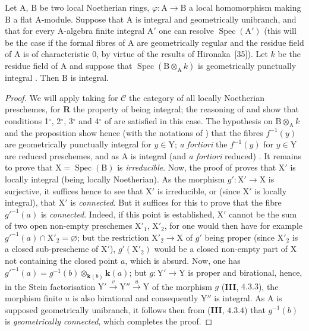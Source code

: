 \begin{corollary}[7.9.9]
\label{IV.7.9.9}
Let $\mathrm{A}$, $\mathrm{B}$ be two local Noetherian rings, $\varphi:\mathrm{A}\to\mathrm{B}$ a local homomorphism making $\mathrm{B}$ a flat $\mathrm{A}$-module. Suppose that $\mathrm{A}$ is integral and geometrically unibranch, and that for every $\mathrm{A}$-algebra finite integral $\mathrm{A}'$ one can resolve $\operatorname{Spec}(\mathrm{A}')$ (this will be the case if the formal fibres of $\mathrm{A}$ are geometrically regular and the residue field of $\mathrm{A}$ is of characteristic $0$, by virtue of the results of Hironaka~[35]). Let $k$ be the residue field of $\mathrm{A}$ and suppose that $\operatorname{Spec}(\mathrm{B}\otimes_\mathrm{A} k)$ is geometrically punctually integral . Then $\mathrm{B}$ is integral.
\end{corollary}

\begin{proof}
We will apply  taking for $\mathcal{C}$ the category of all locally Noetherian preschemes, for $\boldsymbol{R}$ the property of being integral; the reasoning of  and  show that conditions 1${}^\circ$, 2${}^\circ$, 3${}^\circ$ and 4${}^\circ$ of  are satisfied in this case. The hypothesis on $\mathrm{B}\otimes_\mathrm{A} k$ and the proposition  show hence (with the notations of ) that the fibres $f^{-1}(y)$ are geometrically punctually integral for $y\in\mathrm{Y}$; \emph{a fortiori} the $f^{-1}(y)$ for $y\in\mathrm{Y}$ are reduced preschemes, and as $\mathrm{A}$ is integral (and \emph{a fortiori} reduced) . It remains to prove that $\mathrm{X}=\operatorname{Spec}(\mathrm{B})$ is \emph{irreducible}. Now, the proof of  proves that $\mathrm{X}'$ is locally integral (being locally Noetherian). As the morphism $g':\mathrm{X}'\to\mathrm{X}$ is surjective, it suffices hence to see that $\mathrm{X}'$ is irreducible, or (since $\mathrm{X}'$ is locally integral), that $\mathrm{X}'$ is \emph{connected}. But it suffices for this to prove that the fibre $g'^{-1}(a)$ is \emph{connected}. Indeed, if this point is established, $\mathrm{X}'$ cannot be the sum of two open non-empty preschemes $\mathrm{X}'_1$, $\mathrm{X}'_2$, for one would then have for example $g'^{-1}(a)\cap\mathrm{X}'_2=\varnothing$; but the restriction $\mathrm{X}'_2\to\mathrm{X}$ of $g'$ being proper (since $\mathrm{X}'_2$ is a closed sub-prescheme of $\mathrm{X}'$), $g'(\mathrm{X}'_2)$ would be a closed non-empty part of $\mathrm{X}$ not containing the closed point $a$, which is absurd. Now, one has $g'^{-1}(a)=g^{-1}(b)\otimes_{\boldsymbol{k}(b)}\boldsymbol{k}(a)$; but $g:\mathrm{Y}'\to\mathrm{Y}$ is proper and birational, hence, in the Stein factorisation $\mathrm{Y}'\xrightarrow{v}\mathrm{Y}''\xrightarrow{u}\mathrm{Y}$ of the morphism $g$ (\textbf{III}, $4.3.3$), the morphism finite $u$ is also birational and consequently $\mathrm{Y}''$ is integral. As $\mathrm{A}$ is supposed geometrically unibranch, it follows then from (\textbf{III}, $4.3.4$) that $g^{-1}(b)$ is \emph{geometrically connected}, which completes the proof.
\end{proof}

